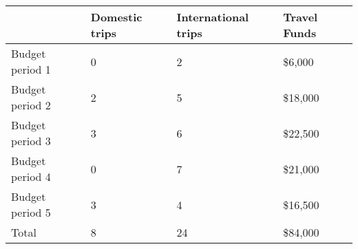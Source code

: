 \begin{tabular}{llll}
\hline
{} & Domestic trips & International trips & Travel Funds \\
\hline
Budget period 1 &              0 &                   2 &       \$6,000 \\
Budget period 2 &              2 &                   5 &      \$18,000 \\
Budget period 3 &              3 &                   6 &      \$22,500 \\
Budget period 4 &              0 &                   7 &      \$21,000 \\
  Budget period 5 &              3 &                   4 &      \$16,500 \\
 \hline
Total &              8 &                   24 &      \$84,000 \\
\hline
\end{tabular}

